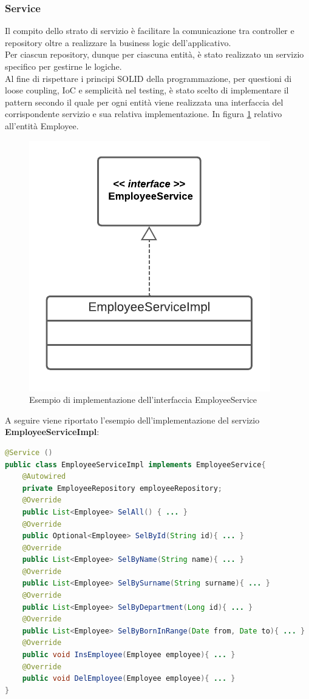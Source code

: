 \subsubsection*{Service}
Il compito dello strato di servizio è facilitare la comunicazione tra controller e repository oltre a realizzare la business logic dell'applicativo.\\
Per ciascun repository, dunque per ciascuna entità, è stato realizzato un servizio specifico per gestirne le logiche.\\
Al fine di rispettare i principi SOLID della programmazione, per questioni di loose coupling, IoC e semplicità nel testing, è stato scelto di implementare il pattern secondo il quale per ogni entità viene realizzata una interfaccia del corrispondente servizio e sua relativa implementazione. In figura \ref{service-serviceImpl} relativo all'entità Employee.
\FloatBarrier
\begin{figure}[!ht]
\centering
\includegraphics[width=0.4\linewidth]{immagini/service_serviceImpl.pdf}
\caption{Esempio di implementazione dell'interfaccia EmployeeService}
\label{service-serviceImpl}
\end{figure}
\FloatBarrier
A seguire viene riportato l'esempio dell'implementazione del servizio \textbf{EmployeeServiceImpl}:
\begin{lstlisting}[language=Java, title={EmployeeServiceImpl.java}, morecomment={[s][\color{DarkOrchid}]{@}{\ }},  morecomment={[s][\color{OliveGreen}]{"}{"}},]
@Service ()
public class EmployeeServiceImpl implements EmployeeService{
    @Autowired
    private EmployeeRepository employeeRepository;
    @Override
    public List<Employee> SelAll() { ... }
    @Override
    public Optional<Employee> SelById(String id){ ... }
    @Override
    public List<Employee> SelByName(String name){ ... }
    @Override
    public List<Employee> SelBySurname(String surname){ ... }
    @Override
    public List<Employee> SelByDepartment(Long id){ ... }
    @Override
    public List<Employee> SelByBornInRange(Date from, Date to){ ... }
    @Override
    public void InsEmployee(Employee employee){ ... }
    @Override
    public void DelEmployee(Employee employee){ ... }
}
\end{lstlisting}
